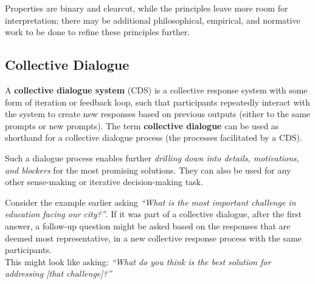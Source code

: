 \documentclass[sigconf,authorversion,nonacm,linkcolor=blue,colorlinks]{acmart}
\begin{document}
Properties are binary and clearcut, while the principles leave more room for interpretation; there may be additional philosophical, empirical, and normative work to be done to refine these principles further.

\hypertarget{collective-dialogue}{%
\subsection{Collective Dialogue}\label{collective-dialogue}}

A \textbf{collective dialogue system} (CDS) is a collective response system with some form of iteration or feedback loop, such that participants repeatedly interact with the system to create new responses based on previous outputs (either to the same prompts or new prompts). The term \textbf{collective dialogue} can be used as shorthand for a collective dialogue process (the processes facilitated by a CDS).

Such a dialogue process enables further \emph{drilling down into details, motivations, and blockers} for the most promising solutions. They can also be used for any other sense-making or iterative decision-making task. 

\begin{example}
Consider the example earlier asking \emph{``What is the most important challenge in education facing our city?''}. If it was part of a collective dialogue, after the first answer, a follow-up question might be asked based on the responses that are deemed most representative, in a new collective response process with the same participants. \\
This might look like asking: \emph{``What do you think is the best solution for addressing {[}that challenge{]}?''}
\end{example}

%
%
\end{document}
